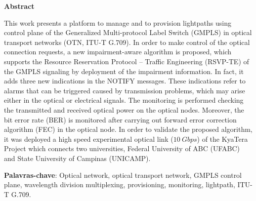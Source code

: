 \newpage \thispagestyle{plain} 
\vspace{1.5cm}
\begin{center}
{\huge{\textbf{Abstract}}}
\end{center}
\vspace{0.5cm}

This work presents a platform to manage and to provision lightpaths using control plane of the Generalized Multi-protocol Label Switch (GMPLS) in optical transport networks (OTN, ITU-T G.709). In order to make control of the optical connection requests, a new impairment-aware algorithm is proposed, which supports the Resource Reservation Protocol -- Traffic Engineering (RSVP-TE) of the GMPLS signaling by deployment of the impairment information. In fact, it adds three new indications in the NOTIFY messages. These indications refer to alarms that can be triggered caused by transmission problems, which may arise either in the optical or electrical signals. The monitoring is performed checking the transmitted and received optical power on the optical nodes. Moreover, the bit error rate (BER) is monitored after carrying out forward error correction algorithm (FEC) in the optical node. In order to validate the proposed algorithm, it was deployed a high speed experimental optical link ($10~Gbps$) of the KyaTera Project which connects two universities, Federal University of ABC (UFABC) and State University of Campinas (UNICAMP).

\vspace{1.5ex}

\textbf{Palavras-chave}: Optical network, optical transport network, GMPLS control plane, wavelength division multiplexing, provisioning, monitoring, lightpath, ITU-T G.709.
